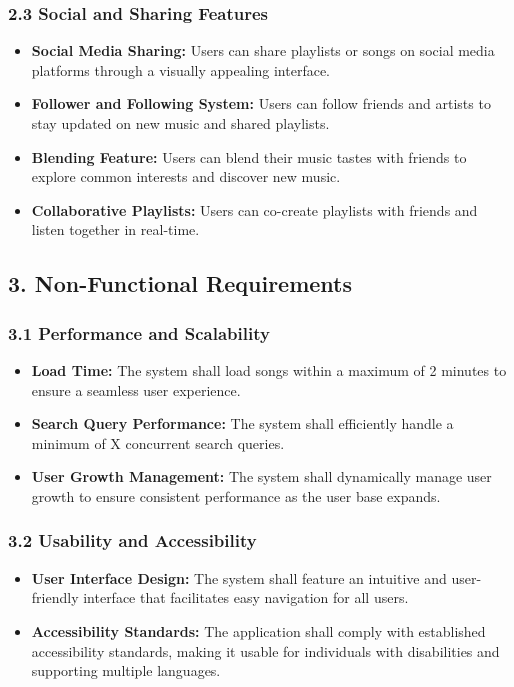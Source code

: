 \documentclass[a4paper,10pt]{article}
\begin{document}
\subsubsection{2.3 Social and Sharing Features}
    \begin{itemize}[leftmargin=*]
        \item \textbf{Social Media Sharing:} Users can share playlists or songs on social media platforms through a visually appealing interface.
        \item \textbf{Follower and Following System:} Users can follow friends and artists to stay updated on new music and shared playlists.
        \item \textbf{Blending Feature:} Users can blend their music tastes with friends to explore common interests and discover new music.
        \item \textbf{Collaborative Playlists:} Users can co-create playlists with friends and listen together in real-time.
    \end{itemize}

\subsection{3. Non-Functional Requirements}
\subsubsection{3.1 Performance and Scalability}
    \begin{itemize}[leftmargin=*]
        \item \textbf{Load Time:} The system shall load songs within a maximum of 2 minutes to ensure a seamless user experience.
        \item \textbf{Search Query Performance:} The system shall efficiently handle a minimum of X concurrent search queries.
        \item \textbf{User Growth Management:} The system shall dynamically manage user growth to ensure consistent performance as the user base expands.
    \end{itemize}

\subsubsection{3.2 Usability and Accessibility}
    \begin{itemize}[leftmargin=*]
        \item \textbf{User Interface Design:} The system shall feature an intuitive and user-friendly interface that facilitates easy navigation for all users.
        \item \textbf{Accessibility Standards:} The application shall comply with established accessibility standards, making it usable for individuals with disabilities and supporting multiple languages.
    \end{itemize}
\end{document}
